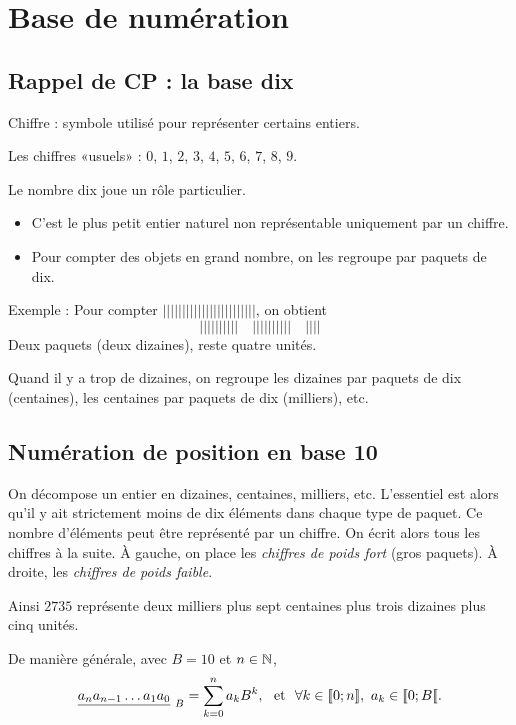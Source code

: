 \section{Base de numération}
\subsection{Rappel de CP : la base dix}
Chiffre : symbole utilisé pour représenter certains entiers.

Les chiffres «usuels» : $0$, $1$, $2$, $3$, $4$, $5$, $6$, $7$, $8$,
$9$.

Le nombre dix joue un rôle particulier.
\begin{itemize}
\item C'est le plus petit entier naturel non représentable uniquement par un chiffre.
\item Pour compter des objets en grand nombre, on les regroupe par paquets de dix.
\end{itemize}

Exemple : Pour compter $||||||||||||||||||||||||$, on obtient
\begin{equation*}
 ||||||||||\quad ||||||||||\quad |||| 
\end{equation*}
Deux paquets (deux dizaines), reste quatre unités.

Quand il y a trop de dizaines, on regroupe les dizaines par paquets de
dix (centaines), les centaines par paquets de dix (milliers), etc.

\subsection{Numération de position en base 10}


On décompose un entier en dizaines, centaines, milliers, etc. 
L'essentiel est alors qu'il y ait strictement moins de dix éléments dans chaque type de paquet. Ce nombre d'éléments peut être représenté par un chiffre.
On écrit alors tous les chiffres à la suite. À gauche, on place les \emph{chiffres de poids fort} (gros paquets). À droite, les \emph{chiffres de poids faible}.

Ainsi $2735$ représente deux milliers plus sept centaines plus trois
dizaines plus cinq unités.

De manière générale, avec $B=10$ et $n\in\mathbb{N}$,
$$\displaystyle\underline{a_{n}a_{n-1}\ldots a_{1}a_{0}}_{~B} =
\sum_{k=0}^{n}a_{k}B^{k},~ \textrm{ et }~\forall k \in [\![0;n]\!],~ a_k\in[\![0;B[\![.$$ 



